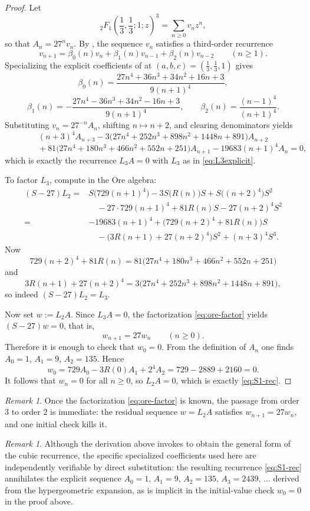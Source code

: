 \documentclass[11pt]{amsart}
\theoremstyle{remark}
\newtheorem{remark}[theorem]{Remark}
\begin{document}
\begin{proof}
Let
\[
{}_2F_1\!\left(\frac13,\frac13;1;z\right)^3=\sum_{n\ge0}v_n z^n,
\]
so that $A_n=27^n v_n$.
By \cite[Theorem~3.1]{MT}, the sequence $v_n$ satisfies a third-order recurrence
\[
v_{n+1}=\beta_0(n)v_n+\beta_1(n)v_{n-1}+\beta_2(n)v_{n-2}
\qquad (n\ge 1).
\]
Specializing the explicit coefficients of \cite[Theorem~3.1]{MT} at
$(a,b,c)=(\frac13,\frac13,1)$ gives
\[
\beta_0(n)=\frac{27n^4+36n^3+34n^2+16n+3}{9(n+1)^4},
\]
\[
\beta_1(n)=-\frac{27n^4-36n^3+34n^2-16n+3}{9(n+1)^4},
\qquad
\beta_2(n)=\frac{(n-1)^4}{(n+1)^4}.
\]
Substituting $v_n=27^{-n}A_n$, shifting $n\mapsto n+2$, and clearing denominators yields
\[
(n+3)^4A_{n+3}
-3\bigl(27n^4+252n^3+898n^2+1448n+891\bigr)A_{n+2}
\]
\[
\qquad\qquad
+81\bigl(27n^4+180n^3+466n^2+552n+251\bigr)A_{n+1}
-19683(n+1)^4A_n=0,
\]
which is exactly the recurrence $L_3A=0$ with $L_3$ as in \eqref{eq:L3explicit}.

To factor $L_3$, compute in the Ore algebra:
\[
\begin{aligned}
(S-27)L_2
={}&S\bigl(729(n+1)^4\bigr)-3S\bigl(R(n)\bigr)S+S\bigl((n+2)^4\bigr)S^2 \\
&\quad-27\cdot 729(n+1)^4+81R(n)S-27(n+2)^4S^2 \\
={}&-19683(n+1)^4+\bigl(729(n+2)^4+81R(n)\bigr)S \\
&\quad-\bigl(3R(n+1)+27(n+2)^4\bigr)S^2+(n+3)^4S^3.
\end{aligned}
\]
Now
\[
729(n+2)^4+81R(n)
=81\bigl(27n^4+180n^3+466n^2+552n+251\bigr)
\]
and
\[
3R(n+1)+27(n+2)^4
=3\bigl(27n^4+252n^3+898n^2+1448n+891\bigr),
\]
so indeed $(S-27)L_2=L_3$.

Now set $w:=L_2A$.
Since $L_3A=0$, the factorization \eqref{eq:ore-factor} yields
$(S-27)w=0$,
that is,
\[
w_{n+1}=27w_n \qquad (n\ge 0).
\]
Therefore it is enough to check that $w_0=0$.
From the definition of $A_n$ one finds
$A_0=1$, $A_1=9$, $A_2=135$.
Hence
\[
w_0
=729A_0-3R(0)A_1+2^4A_2
=729-2889+2160=0.
\]
It follows that $w_n=0$ for all $n\ge 0$,
so $L_2A=0$, which is exactly \eqref{eq:S1-rec}.
\end{proof}

\begin{remark}
Once the factorization \eqref{eq:ore-factor} is known, the passage from order $3$ to order $2$ is immediate:
the residual sequence $w=L_2A$ satisfies
$w_{n+1}=27w_n$, and one initial check kills it.
\end{remark}

\begin{remark}
Although the derivation above invokes \cite[Theorem~3.1]{MT} to obtain the general form of the
cubic recurrence, the specific specialized coefficients used here are independently verifiable
by direct substitution: the resulting recurrence \eqref{eq:S1-rec} annihilates the explicit
sequence $A_0=1,\,A_1=9,\,A_2=135,\,A_3=2439,\,\ldots$ derived from the hypergeometric expansion,
as is implicit in the initial-value check $w_0=0$ in the proof above.
\end{remark}
\end{document}
